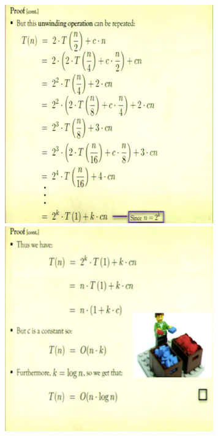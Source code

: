 \documentclass[12pt]{article}
\begin{document}
\begin{itemize}
\begin{itemize}
\begin{itemize}
\begin{itemize}
\begin{enumerate}
\begin{center}
				\includegraphics{lecture2b}
				\includegraphics{lecture2c}
				\end{center}
				\end{enumerate}
			\end{itemize}
		\end{itemize}
	\end{itemize}
\end{itemize}
\end{document}
